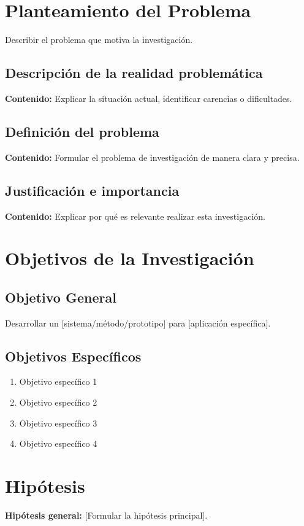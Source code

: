 \documentclass[12pt, letterpaper, oneside]{book}
\begin{document}
\section{Planteamiento del Problema}
Describir el problema que motiva la investigación.

\subsection{Descripción de la realidad problemática}
\textbf{Contenido:} Explicar la situación actual, identificar carencias o dificultades.

\subsection{Definición del problema}
\textbf{Contenido:} Formular el problema de investigación de manera clara y precisa.

\subsection{Justificación e importancia}
\textbf{Contenido:} Explicar por qué es relevante realizar esta investigación.

\section{Objetivos de la Investigación}

\subsection{Objetivo General}
Desarrollar un [sistema/método/prototipo] para [aplicación específica].

\subsection{Objetivos Específicos}
\begin{enumerate}
    \item Objetivo específico 1
    \item Objetivo específico 2
    \item Objetivo específico 3
    \item Objetivo específico 4
\end{enumerate}

\section{Hipótesis}
\textbf{Hipótesis general:} [Formular la hipótesis principal].
\end{document}
